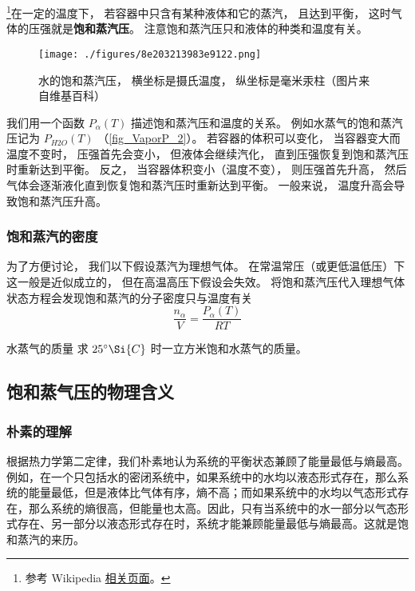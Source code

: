 

\footnote{参考 Wikipedia \href{https://en.wikipedia.org/wiki/Vapor_pressure}{相关页面}。}在一定的温度下， 若容器中只含有某种液体和它的蒸汽， 且达到平衡， 这时气体的压强就是\textbf{饱和蒸汽压}。 注意饱和蒸汽压只和液体的种类和温度有关。

\begin{figure}[ht]
\centering
\texttt{[image: ./figures/8e203213983e9122.png]}
\caption{水的饱和蒸汽压， 横坐标是摄氏温度， 纵坐标是毫米汞柱（图片来自维基百科）} \label{fig_VaporP_2}
\end{figure}

我们用一个函数 $P_\alpha(T)$ 描述饱和蒸汽压和温度的关系。 例如水蒸气的饱和蒸汽压记为 $P_{H2O}(T)$ （\autoref{fig_VaporP_2}）。 若容器的体积可以变化， 当容器变大而温度不变时， 压强首先会变小， 但液体会继续汽化， 直到压强恢复到饱和蒸汽压时重新达到平衡。 反之， 当容器体积变小（温度不变）， 则压强首先升高，  然后气体会逐渐液化直到恢复饱和蒸汽压时重新达到平衡。 一般来说， 温度升高会导致饱和蒸汽压升高。

\subsubsection{饱和蒸汽的密度}
为了方便讨论， 我们以下假设蒸汽为理想气体。 在常温常压（或更低温低压）下这一般是近似成立的， 但在高温高压下假设会失效。 将饱和蒸汽压代入理想气体状态方程会发现饱和蒸汽的分子密度只与温度有关
\begin{equation}\label{eq_VaporP_2}
\frac{n_\alpha}{V}  = \frac{P_\alpha(T)}{R T}
\end{equation}

\begin{exercise}{水蒸气的质量}
求 $25^\circ\Si{C}$ 时一立方米饱和水蒸气的质量。
\end{exercise}

\subsection{饱和蒸气压的物理含义}
\subsubsection{朴素的理解}
根据热力学第二定律，我们朴素地认为系统的平衡状态兼顾了能量最低与熵最高。例如，在一个只包括水的密闭系统中，如果系统中的水均以液态形式存在，那么系统的能量最低，但是液体比气体有序，熵不高；而如果系统中的水均以气态形式存在，那么系统的熵很高，但能量也太高。因此，只有当系统中的水一部分以气态形式存在、另一部分以液态形式存在时，系统才能兼顾能量最低与熵最高。这就是饱和蒸汽的来历。

